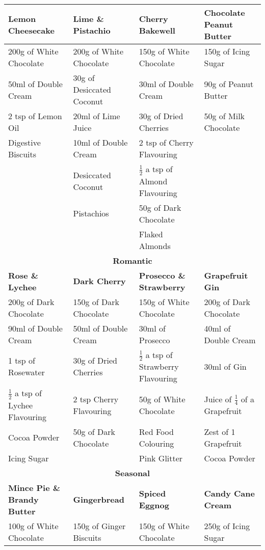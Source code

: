 \documentclass[11pt, english]{article}
\begin{document}
\begin{center}
\begin{longtable}{p{4cm}p{4cm}p{4cm}p{4cm}}
	        \hline
	        \hline
	        \textbf{Lemon Cheesecake} & \textbf{Lime \& Pistachio} & \textbf{Cherry Bakewell} & \textbf{Chocolate Peanut Butter}\\
	        \hline
	        200g of White Chocolate & 200g of White Chocolate & 150g of White Chocolate & 150g of Icing Sugar\\
	        50ml of Double Cream & 30g of Desiccated Coconut & 30ml of Double Cream & 90g of Peanut Butter\\
	        2 tsp of Lemon Oil & 20ml of Lime Juice & 30g of Dried Cherries & 50g of Milk Chocolate\\
	        Digestive Biscuits & 10ml of Double Cream & 2 tsp of Cherry Flavouring & \\
	        & Desiccated Coconut & $\frac{1}{2}$ a tsp of Almond Flavouring & \\
	        & Pistachios & 50g of Dark Chocolate & \\
	        & & Flaked Almonds & \\
	        \hline
	        \hline
	        \multicolumn{4}{c}{\textbf{Romantic}}\\
	        \hline
	        \hline
	        \textbf{Rose \& Lychee} & \textbf{Dark Cherry} & \textbf{Prosecco \& Strawberry} & \textbf{Grapefruit Gin}\\
	        \hline
	        200g of Dark Chocolate & 150g of Dark Chocolate & 150g of White Chocolate & 200g of Dark Chocolate\\
	        90ml of Double Cream & 50ml of Double Cream & 30ml of Prosecco & 40ml of Double Cream\\
	        1 tsp of Rosewater & 30g of Dried Cherries & $\frac{1}{2}$ a tsp of Strawberry Flavouring & 30ml of Gin\\
	        $\frac{1}{2}$ a tsp of Lychee Flavouring & 2 tsp Cherry Flavouring & 50g of White Chocolate & Juice of $\frac{1}{4}$ of a Grapefruit\\
	        Cocoa Powder & 50g of Dark Chocolate & Red Food Colouring & Zest of 1 Grapefruit\\
	        Icing Sugar & & Pink Glitter & Cocoa Powder\\
	        \hline
	        \hline
		\multicolumn{4}{c}{\textbf{Seasonal}}\\
	        \hline
	        \hline
		\textbf{Mince Pie \& Brandy Butter} & \textbf{Gingerbread} & \textbf{Spiced Eggnog} & \textbf{Candy Cane Cream}\\
        	\hline
        	100g of White Chocolate & 150g of Ginger Biscuits & 150g of White Chocolate & 250g of Icing Sugar\\

\end{longtable}
\end{center}
\end{document}
